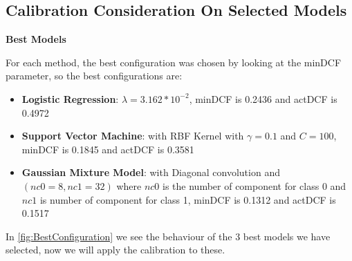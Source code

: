 
\subsection{Calibration Consideration On Selected Models}
\label{subsec:bestModels}
\textbf{Best Models}

For each method, the best configuration was chosen by looking at the minDCF parameter, so the best configurations are:

\begin{itemize}
    \item \textbf{Logistic Regression}: \(\lambda=3.162*10^{-2}\), minDCF is 0.2436 and actDCF is 0.4972
    \item \textbf{Support Vector Machine}: with RBF Kernel with \(\gamma=0.1\) and \(C=100\), minDCF is 0.1845 and actDCF is 0.3581
    \item \textbf{Gaussian Mixture Model}: with Diagonal convolution and \((nc0=8, nc1=32)\) where \(nc0\) is the number of
    component for class 0 and \(nc1\) is number of component for class 1, minDCF is 0.1312 and actDCF is 0.1517
\end{itemize}

In \autoref{fig:BestConfiguration} we see the behaviour of the 3 best models we have selected, now we will apply the calibration to these.

